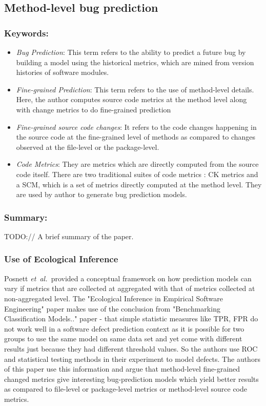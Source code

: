 \documentclass{sig-alternate-05-2015}
\newcommand{\etal}{\mbox{\emph{et al.\ }}}
\begin{document}
\subsection{Method-level bug prediction \cite{Giger:2012}}

\subsubsection{Keywords:}
\begin{itemize}
\item \emph{Bug Prediction}: This term refers to the ability to predict a future bug by building a model using the historical metrics, which are mined from version histories of software modules.
\item \emph{Fine-grained Prediction}: This term refers to the use of method-level details. Here, the author computes source code metrics at the method level along with change metrics to do fine-grained prediction
\item \emph{Fine-grained source code changes}: It refers to the code changes happening in the source code at the fine-grained level of methods as compared to changes observed at the file-level or the package-level.
\item \emph{Code Metrics}: They are metrics which are directly computed from the source code itself. There are two traditional suites of code metrics : CK metrics and a SCM, which is a set of metrics directly computed at the method level. They are used by author to generate bug prediction models.
\end{itemize} 

\subsubsection{Summary:}
TODO:// A brief summary of the paper.

\subsubsection{Use of Ecological Inference}
Posnett \etal provided a conceptual framework on how prediction models can vary if metrics that are collected at aggregated with that of metrics collected at non-aggregated level. The "Ecological Inference in Empirical Software Engineering" paper makes use of the conclusion from "Benchmarking Classification Models.." paper - that simple statistic measures like TPR, FPR do not work well in a software defect prediction context as it is possible for two groups to use the same model on same data set and yet come with different results just because they had different threshold values. So the authors use ROC and statistical testing methods in their experiment to model defects. The authors of this paper use this information and argue that method-level fine-grained changed metrics give interesting bug-prediction models which yield better results as compared to file-level or package-level metrics or method-level source code metrics.
\end{document}
